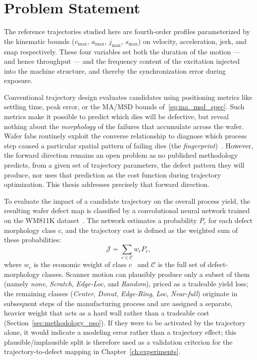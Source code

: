 \section{Problem Statement}\label{sec:control_problem}

The reference trajectories studied here are fourth-order profiles parameterized by the kinematic bounds ($v_{\max}$, $a_{\max}$, $j_{\max}$, $s_{\max}$) on velocity, acceleration, jerk, and snap respectively. These four variables set both the duration of the motion --- and hence throughput --- and the frequency content of the excitation injected into the machine structure, and thereby the synchronization error during exposure.

Conventional trajectory design evaluates candidates using positioning metrics like settling time, peak error, or the MA/MSD bounds of~\eqref{eq:ma_msd_spec}. Such metrics make it possible to predict which dies will be defective, but reveal nothing about the \textit{morphology} of the failures that accumulate across the wafer. Wafer fabs routinely exploit the converse relationship to diagnose which process step caused a particular spatial pattern of failing dies (the \textit{fingerprint})~\cite{Lam2015_Fingerprint}. However, the forward direction remains an open problem as no published methodology predicts, from a given set of trajectory parameters, the defect pattern they will produce, nor uses that prediction as the cost function during trajectory optimization. This thesis addresses precisely that forward direction.

To evaluate the impact of a candidate trajectory on the overall process yield, the resulting wafer defect map is classified by a convolutional neural network trained on the WM811K dataset~\cite{Wu2015_WM811K}. The network estimates a probability $P_c$ for each defect morphology class $c$, and the trajectory cost is defined as the weighted sum of these probabilities:
\begin{equation}
    \mathcal{J} = \sum_{c \in \mathcal{C}} w_c P_c,
    \label{eq:cost}
\end{equation}
where $w_c$ is the economic weight of class $c$~\cite{Kim2017_Market, Kim2019_Productivity, Yang2018_Yield} and $\mathcal{C}$ is the full set of defect-morphology classes. Scanner motion can plausibly produce only a subset of them (namely \textit{none}, \textit{Scratch}, \textit{Edge-Loc}, and \textit{Random}), priced as a tradeable yield loss; the remaining classes (\textit{Center}, \textit{Donut}, \textit{Edge-Ring}, \textit{Loc}, \textit{Near-full}) originate in subsequent steps of the manufacturing process and are assigned a separate, heavier weight that acts as a hard wall rather than a tradeable cost (Section~\ref{sec:methodology_pso}). If they were to be activated by the trajectory alone, it would indicate a modeling error rather than a trajectory effect; this plausible/implausible split is therefore used as a validation criterion for the trajectory-to-defect mapping in Chapter~\ref{ch:experiments}.

